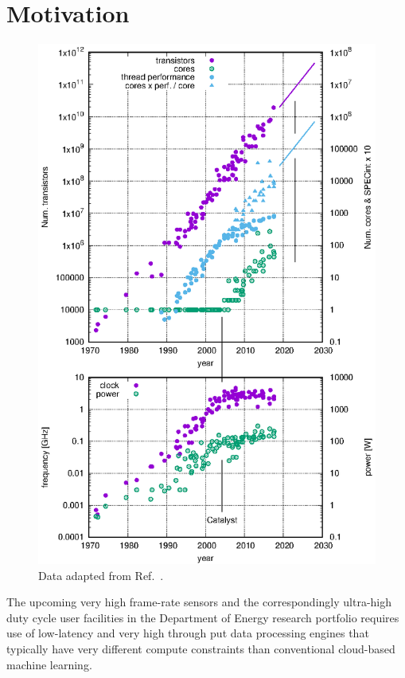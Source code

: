 \documentclass{article}
\begin{document}
\section{Motivation}
\begin{figure}
	\centerline{ \includegraphics[clip,trim={-2cm -2cm 1.5cm 1.5cm},width=\linewidth]{plotting_technology.eps} }
	\caption{
		\label{fig::technology} 
		Data adapted from Ref.~\cite{MicroprocessorTrendData}. 
	}
\end{figure}

The upcoming very high frame-rate sensors and the correspondingly ultra-high duty cycle user facilities in the Department of Energy research portfolio requires use of low-latency and very high through put data processing engines that typically have very different compute constraints than conventional cloud-based machine learning.
\end{document}
